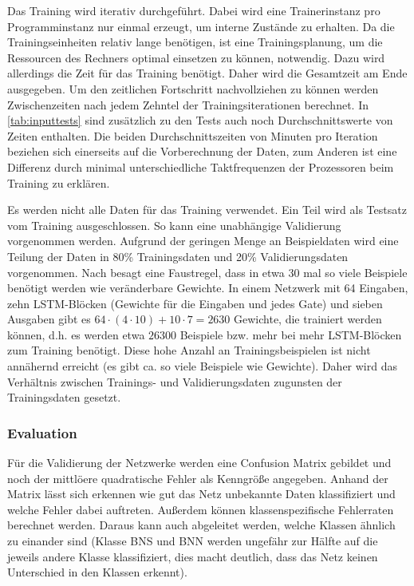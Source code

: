 Das Training wird iterativ durchgeführt. Dabei wird eine Trainerinstanz pro
Programminstanz nur einmal erzeugt, um interne Zustände zu erhalten. Da die
Trainingseinheiten relativ lange benötigen, ist eine Trainingsplanung, um die
Ressourcen des Rechners optimal einsetzen zu können, notwendig. Dazu wird
allerdings die Zeit für das Training benötigt. Daher wird die Gesamtzeit am Ende
ausgegeben. Um den zeitlichen Fortschritt nachvollziehen zu können werden
Zwischenzeiten nach jedem Zehntel der Trainingsiterationen berechnet. In
\autoref{tab:inputtests} sind zusätzlich zu den Tests auch noch
Durchschnittswerte von Zeiten enthalten. Die beiden Durchschnittszeiten von
Minuten pro Iteration beziehen sich einerseits auf die Vorberechnung der Daten,
zum Anderen ist eine Differenz durch minimal unterschiedliche Taktfrequenzen der
Prozessoren beim Training zu erklären.

Es werden nicht alle Daten für das Training verwendet. Ein Teil wird als
Testsatz vom Training ausgeschlossen. So kann eine unabhängige Validierung
vorgenommen werden. Aufgrund der geringen Menge an Beispieldaten wird eine
Teilung der Daten in 80\% Trainingsdaten und 20\% Validierungsdaten vorgenommen.
Nach \cite{NNFAQ} besagt eine Faustregel, dass in etwa 30 mal so viele Beispiele
benötigt werden wie veränderbare Gewichte. In einem Netzwerk mit 64 Eingaben,
zehn \ac{LSTM}-Blöcken (Gewichte für die Eingaben und jedes Gate) und sieben
Ausgaben gibt es $64\cdot(4\cdot10)+10\cdot7 = 2630$ Gewichte, die trainiert
werden können, d.h. es werden etwa $26300$ Beispiele bzw. mehr bei mehr
\ac{LSTM}-Blöcken zum Training benötigt. Diese hohe Anzahl an
Trainingsbeispielen ist nicht annähernd erreicht (es gibt ca. so viele Beispiele
wie Gewichte). Daher wird das Verhältnis zwischen Trainings- und
Validierungsdaten zugunsten der Trainingsdaten gesetzt.

\subsubsection{Evaluation}
Für die Validierung der Netzwerke werden eine Confusion Matrix gebildet und noch
der mittlöere quadratische Fehler als Kenngröße angegeben. Anhand der Matrix
lässt sich erkennen wie gut das Netz unbekannte Daten klassifiziert und welche
Fehler dabei auftreten. Außerdem können klassenspezifische Fehlerraten berechnet
werden. Daraus kann auch abgeleitet werden, welche Klassen ähnlich zu einander
sind (Klasse \ac{BNS} und \ac{BNN} werden ungefähr zur Hälfte auf die jeweils
andere Klasse klassifiziert, dies macht deutlich, dass das Netz keinen
Unterschied in den Klassen erkennt).

